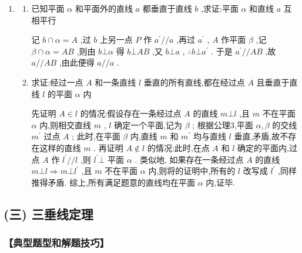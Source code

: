 \begin{enumerate}
\begin{jieda}
\begin{enumerate}
            第 3 步:求 ${ON}$ 的长:由 $\bigtriangleup  {ONM} \sim   \bigtriangleup  {GCM} \Longrightarrow  \dfrac{ON}{GC} = \dfrac{OM}{GM}$ ,其中 ${OM} = \dfrac{1}{4}{AC} = \dfrac{\sqrt{2}}{4}{AB} = \sqrt{2}$ , ${GM}$  $= \sqrt{C{M}^{2} + C{G}^{2}} = \sqrt{{\left( 3\sqrt{2}\right) }^{2} + {2}^{2}} = \sqrt{22}$ ,解得 ${ON} = \dfrac{2\sqrt{11}}{11}$ .
        \end{enumerate}
    \end{jieda}
    \item \begin{enumerate}
        \item 已知平面 $\alpha$ 和平面外的直线 $a$ 都垂直于直线 $b$ ,求证:平面 $\alpha$ 和直线 $a$ 互相平行
        \begin{jieda}
            记 $b \cap  \alpha  = A$ ,过 $b$ 上另一点 $P$ 作 ${a}^{\prime }//a$ ,再过 ${a}^{\prime }$ , $A$ 作平面 $\beta$ ,记 $\beta  \cap  \alpha  = {AB}$ ,则由 $b\bot \alpha$ 得 $b\bot {AB}$ ,又 $b\bot a$ , $\therefore b \bot  {a}^{\prime }$ . 于是 ${a}^{\prime }//{AB}$ ,故 $a//{AB}$ ,由此便得 $a//a$ .
        \end{jieda}
        \item 求证:经过一点 $A$ 和一条直线 $l$ 垂直的所有直线,都在经过点 $A$ 且垂直于直线 $l$ 的平面 $\alpha$ 内
        \begin{jieda}
            先证明 $A \in  l$ 的情况:假设存在一条经过点 $A$ 的直线 $m\bot l$ ,且 $m$ 不在平面 $\alpha$ 内,则相交直线 $m$ , $l$ 确定一个平面,记为 $\beta$ ; 根据公理3,平面 $\alpha ,\beta$ 的交线 ${m}^{\prime }$ 过点 $A$ ; 此时,在平面 $\beta$ 内,直线 $m$ 和 ${m}^{\prime }$ 均与直线 $l$ 垂直,矛盾,故不存在这样的直线 $m$ . 再证明 $A \notin  l$ 的情况:此时,在点 $A$ 和 $l$ 确定的平面内,过点 $A$ 作 ${l}^{\prime }//l$ ,则 ${l}^{\prime }\bot$ 平面 $\alpha$ . 类似地, 如果存在一条经过点 $A$ 的直线 $m\bot l \Longrightarrow  m\bot {l}^{\prime }$ ,且 $m$ 不在平面 $\alpha$ 内,则将的证明中,所有的 $l$ 改写成 ${l}^{\prime }$ ,同样推得矛盾. 综上,所有满足题意的直线均在平面 $\alpha$ 内,证毕.
        \end{jieda}
    \end{enumerate}

\end{enumerate}
\subsection*{(三) 三垂线定理}

\subsubsection*{【典型题型和解题技巧】}

